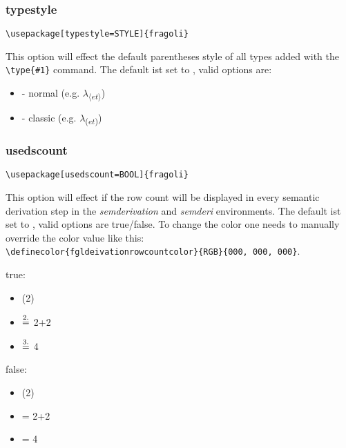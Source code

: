 \documentclass[10pt, a4paper]{article}
\newenvironment{itemizeexample}{
	\begin{itemize}
		\setlength\itemsep{-.5em}
	}
	{
	\end{itemize}
}
\begin{document}
	\subsubsection{typestyle}
	\begin{lstlisting}[style=A]
	\usepackage[typestyle=STYLE]{fragoli}
	\end{lstlisting}
	This option will effect the default parentheses style of all types added with the \verb=\type{#1}= command. The default ist set to \texttt{}, valid options are:
	\begin{itemizeexample}
		\item[-] normal (e.g. $\lambda$\textsubscript{$\langle$$et$$\rangle$})
		\item[-] classic (e.g. $\lambda$\textsubscript{($et$)})
	\end{itemizeexample}
	\subsubsection{usedscount}
	\begin{lstlisting}[style=A]
	\usepackage[usedscount=BOOL]{fragoli}
	\end{lstlisting}
	This option will effect if the row count will be displayed in every semantic derivation step in the \textit{semderivation} and \textit{semderi} environments. The default ist set to \texttt{}, valid options are true/false. To change the color one needs to manually override the color value like this: \\\verb=\definecolor{fgldeivationrowcountcolor}{RGB}{000, 000, 000}=.
	\begin{center}
		\begin{minipage}[h][2cm][t]{15em}
			true:\begin{itemizeexample}
				\item[] (2)
				\item[$\stackrel{\color{fgldeivationrowcountcolor}2.\color{black}}{=}$] 2+2
				\item[$\stackrel{\color{fgldeivationrowcountcolor}3.\color{black}}{=}$] 4
			\end{itemizeexample}
		\end{minipage}
		\begin{minipage}[h][2cm][t]{15em}
			false:\begin{itemizeexample}
				\item[] (2)
				\item[=] 2+2
				\item[=] 4
			\end{itemizeexample}
		\end{minipage}
	\end{center}
\end{document}
